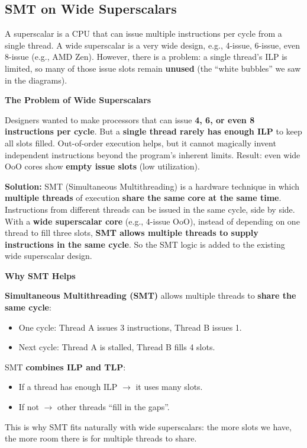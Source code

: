 \subsection{SMT on Wide Superscalars}

A superscalar is a CPU that can issue multiple instructions per cycle from a single thread. A wide superscalar is a very wide design, e.g., 4-issue, 6-issue, even 8-issue (e.g., AMD Zen). However, there is a problem: a single thread's ILP is limited, so many of those issue slots remain \textbf{unused} (the ``white bubbles'' we saw in the diagrams).

\highspace
\begin{flushleft}
    \textcolor{Red2}{ \textbf{The Problem of Wide Superscalars}}
\end{flushleft}
Designers wanted to make processors that can issue \textbf{4, 6, or even 8 instructions per cycle}. But a \textbf{single thread rarely has enough ILP} to keep all slots filled. Out-of-order execution helps, but it cannot magically invent independent instructions beyond the program's inherent limits. Result: even wide OoO cores show \textbf{empty issue slots} (low utilization).

\highspace
\textcolor{Green3}{ \textbf{Solution:}} SMT (Simultaneous Multithreading) is a hardware technique in which \textbf{multiple threads} of execution \textbf{share the same core at the same time}. Instructions from different threads can be issued in the same cycle, side by side. With a \textbf{wide superscalar core} (e.g., 4-issue OoO), instead of depending on one thread to fill three slots, \textbf{SMT allows multiple threads to supply instructions in the same cycle}. So the SMT logic is added to the existing wide superscalar design.

\highspace
\begin{flushleft}
    \textcolor{Green3}{ \textbf{Why SMT Helps}}
\end{flushleft}
\textbf{Simultaneous Multithreading (SMT)} allows multiple threads to \textbf{share the same cycle}:
\begin{itemize}
    \item One cycle: Thread A issues 3 instructions, Thread B issues 1.
    \item Next cycle: Thread A is stalled, Thread B fills 4 slots.
\end{itemize}
SMT \textbf{combines ILP and TLP}:
\begin{itemize}
    \item If a thread has enough ILP $\rightarrow$ it uses many slots.
    \item If not $\rightarrow$ other threads ``fill in the gaps''.
\end{itemize}
This is why SMT fits naturally with wide superscalars: the more slots we have, the more room there is for multiple threads to share.


